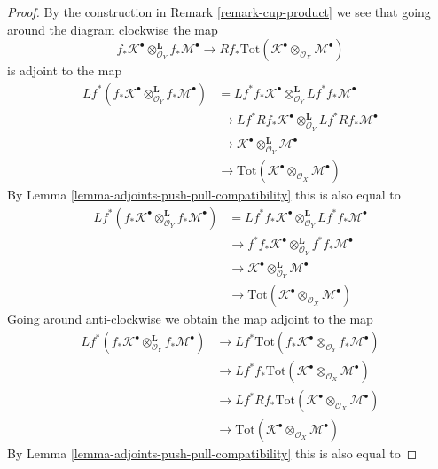 \begin{proof}
By the construction in Remark \ref{remark-cup-product} we see that
going around the diagram clockwise the map
$$
f_*\mathcal{K}^\bullet
\otimes_{\mathcal{O}_Y}^\mathbf{L}
f_*\mathcal{M}^\bullet
\longrightarrow
Rf_*\text{Tot}(\mathcal{K}^\bullet
\otimes_{\mathcal{O}_X}
\mathcal{M}^\bullet)
$$
is adjoint to the map
\begin{align*}
Lf^*(f_*\mathcal{K}^\bullet
\otimes_{\mathcal{O}_Y}^\mathbf{L}
f_*\mathcal{M}^\bullet)
& =
Lf^*f_*\mathcal{K}^\bullet
\otimes_{\mathcal{O}_Y}^\mathbf{L}
Lf^*f_*\mathcal{M}^\bullet \\
& \to
Lf^*Rf_*\mathcal{K}^\bullet
\otimes_{\mathcal{O}_Y}^\mathbf{L}
Lf^*Rf_*\mathcal{M}^\bullet \\
& \to
\mathcal{K}^\bullet
\otimes_{\mathcal{O}_Y}^\mathbf{L}
\mathcal{M}^\bullet \\
& \to
\text{Tot}(\mathcal{K}^\bullet
\otimes_{\mathcal{O}_X}
\mathcal{M}^\bullet)
\end{align*}
By Lemma \ref{lemma-adjoints-push-pull-compatibility} this is also equal to
\begin{align*}
Lf^*(f_*\mathcal{K}^\bullet
\otimes_{\mathcal{O}_Y}^\mathbf{L}
f_*\mathcal{M}^\bullet)
& =
Lf^*f_*\mathcal{K}^\bullet
\otimes_{\mathcal{O}_Y}^\mathbf{L}
Lf^*f_*\mathcal{M}^\bullet \\
& \to
f^*f_*\mathcal{K}^\bullet
\otimes_{\mathcal{O}_Y}^\mathbf{L}
f^*f_*\mathcal{M}^\bullet \\
& \to
\mathcal{K}^\bullet
\otimes_{\mathcal{O}_Y}^\mathbf{L}
\mathcal{M}^\bullet \\
& \to
\text{Tot}(\mathcal{K}^\bullet
\otimes_{\mathcal{O}_X}
\mathcal{M}^\bullet)
\end{align*}
Going around anti-clockwise we obtain the map adjoint to the map
\begin{align*}
Lf^*(f_*\mathcal{K}^\bullet
\otimes_{\mathcal{O}_Y}^\mathbf{L}
f_*\mathcal{M}^\bullet)
& \to
Lf^*\text{Tot}(
f_*\mathcal{K}^\bullet
\otimes_{\mathcal{O}_Y}
f_*\mathcal{M}^\bullet) \\
& \to
Lf^*f_*\text{Tot}(\mathcal{K}^\bullet
\otimes_{\mathcal{O}_X}
\mathcal{M}^\bullet) \\
& \to
Lf^*Rf_*\text{Tot}(\mathcal{K}^\bullet
\otimes_{\mathcal{O}_X}
\mathcal{M}^\bullet) \\
& \to
\text{Tot}(\mathcal{K}^\bullet
\otimes_{\mathcal{O}_X}
\mathcal{M}^\bullet)
\end{align*}
By Lemma \ref{lemma-adjoints-push-pull-compatibility} this is also equal to

\end{proof}
